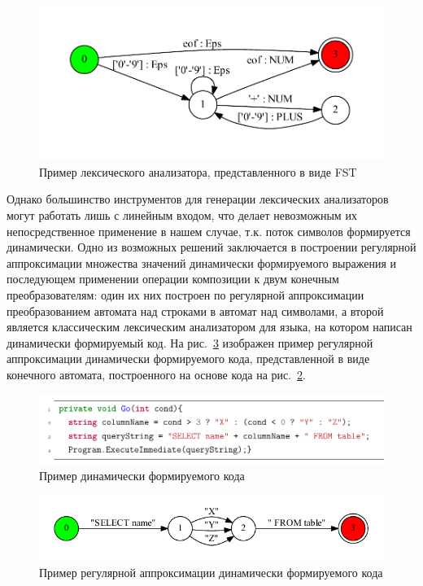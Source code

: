 \begin{figure}[h]
\centering
\includegraphics[width=\textwidth]{Baygeldin/pictures/lexer_.pdf}
\caption{Пример лексического анализатора, представленного в виде FST}
\label{lexer_example}
\end{figure}

Однако большинство инструментов для генерации лексических анализаторов могут работать лишь с линейным входом, что делает невозможным их непосредственное применение в нашем случае, т.к. поток символов формируется динамически. Одно из возможных решений \cite{polubelova} заключается в построении регулярной аппроксимации множества значений динамически формируемого выражения и последующем применении операции композиции \cite{handbook_automata} к двум конечным преобразователям: один их них построен по регулярной аппроксимации преобразованием автомата над строками в автомат над символами, а второй является классическим лексическим анализатором для языка, на котором написан динамически формируемый код. На рис.~\ref{reg_approx_example} изображен пример регулярной аппроксимации динамически формируемого кода, представленной в виде конечного автомата, построенного на основе кода на рис.~\ref{code_sample_2}. 

\begin{figure}[h]
\centering
\includegraphics[width=\textwidth]{Baygeldin/pictures/approx_code.pdf}
\caption{Пример динамически формируемого кода}
\label{code_sample_2}
\end{figure}

\begin{figure}[h]
\centering
\includegraphics[width=\textwidth]{Baygeldin/pictures/approx_fsa.pdf}
\caption{Пример регулярной аппроксимации динамически формируемого кода}
\label{reg_approx_example}
\end{figure}

